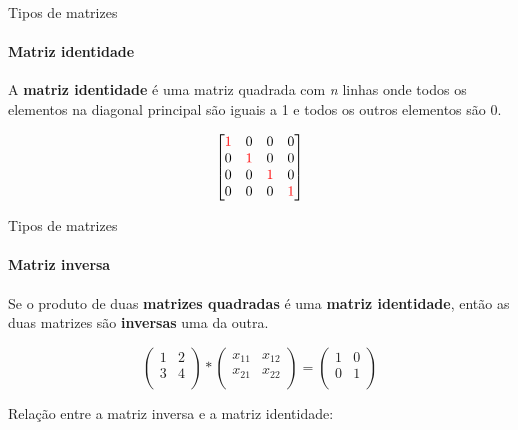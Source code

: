 \begin{frame}[t]{Tipos de matrizes} 
    \framesubtitle{Matriz identidade}

    A \textbf{matriz identidade} é uma matriz quadrada com \textit{n} linhas onde todos os elementos na diagonal principal são iguais a 1 e todos os outros elementos são 0.
    \vspace*{0.5cm}

    \begin{equation}
            \begin{bmatrix}
            \textcolor{red}{1} & 0 & 0 & 0\\
            0 & \textcolor{red}{1} & 0 & 0\\
            0 & 0 & \textcolor{red}{1} & 0\\ 
            0 & 0 & 0 & \textcolor{red}{1}\\ 
         \end{bmatrix}
    \end{equation}
\end{frame}
\begin{frame}[t]{Tipos de matrizes} 
    \framesubtitle{Matriz inversa}

    Se o produto de duas \textbf{matrizes quadradas} é uma \textbf{matriz identidade}, então as duas matrizes são \textbf{inversas} uma da outra.

    \vspace*{0.8cm}

    \begin{equation}
        \begin{pmatrix}
            1 & 2 \\
            3 & 4 \\
        \end{pmatrix}
        *
        \begin{pmatrix}
            x_{11} & x_{12} \\
            x_{21} & x_{22} \\
        \end{pmatrix}
        =
        \begin{pmatrix}
            1 & 0 \\
            0 & 1 \\
        \end{pmatrix}
    \end{equation}

    \vspace*{0.5cm} 

    Relação entre a matriz inversa e a matriz identidade:

    \vspace*{0.5cm} 

    \centering

\end{frame}

